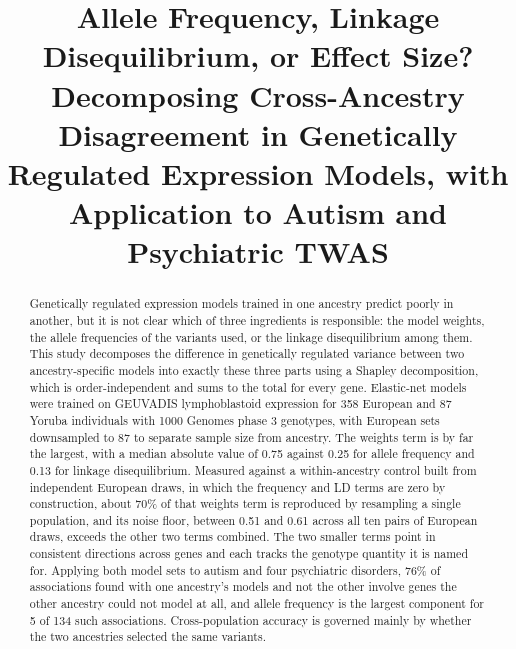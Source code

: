 \documentclass[conference]{IEEEtran}
\begin{document}

\title{Allele Frequency, Linkage Disequilibrium, or Effect Size? Decomposing Cross-Ancestry Disagreement in Genetically Regulated Expression Models, with Application to Autism and Psychiatric TWAS}

\author{
\vspace{12.8pt}
}

\maketitle

\begin{abstract}
Genetically regulated expression models trained in one ancestry predict poorly in another, but it is not clear which of three ingredients is responsible: the model weights, the allele frequencies of the variants used, or the linkage disequilibrium among them. This study decomposes the difference in genetically regulated variance between two ancestry-specific models into exactly these three parts using a Shapley decomposition, which is order-independent and sums to the total for every gene. Elastic-net models were trained on GEUVADIS lymphoblastoid expression for 358 European and 87 Yoruba individuals with 1000 Genomes phase 3 genotypes, with European sets downsampled to 87 to separate sample size from ancestry. The weights term is by far the largest, with a median absolute value of 0.75 against 0.25 for allele frequency and 0.13 for linkage disequilibrium. Measured against a within-ancestry control built from independent European draws, in which the frequency and LD terms are zero by construction, about 70\% of that weights term is reproduced by resampling a single population, and its noise floor, between 0.51 and 0.61 across all ten pairs of European draws, exceeds the other two terms combined. The two smaller terms point in consistent directions across genes and each tracks the genotype quantity it is named for. Applying both model sets to autism and four psychiatric disorders, 76\% of associations found with one ancestry's models and not the other involve genes the other ancestry could not model at all, and allele frequency is the largest component for 5 of 134 such associations. Cross-population accuracy is governed mainly by whether the two ancestries selected the same variants.
\end{abstract}
\end{document}
